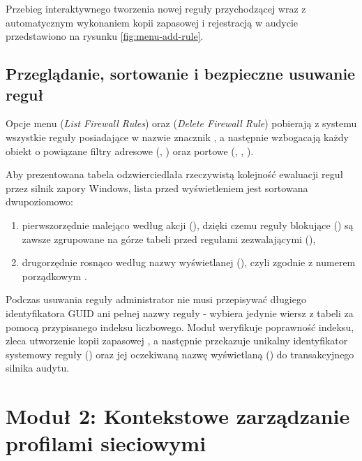 Przebieg interaktywnego tworzenia nowej reguły przychodzącej wraz z automatycznym wykonaniem kopii zapasowej i rejestracją w audycie przedstawiono na rysunku \ref{fig:menu-add-rule}.


\subsection{Przeglądanie, sortowanie i bezpieczne usuwanie reguł}\label{subsec:przegladanie-usuwanie-regul}

Opcje menu  (\textit{List Firewall Rules}) oraz  (\textit{Delete Firewall Rule}) pobierają z systemu wszystkie reguły posiadające w nazwie znacznik , a następnie wzbogacają każdy obiekt o powiązane filtry adresowe (, ) oraz portowe (, , ).

Aby prezentowana tabela odzwierciedlała rzeczywistą kolejność ewaluacji reguł przez silnik zapory Windows, lista przed wyświetleniem jest sortowana dwupoziomowo:
\begin{enumerate}
    \item pierwszorzędnie malejąco według akcji (), dzięki czemu reguły blokujące () są zawsze zgrupowane na górze tabeli przed regułami zezwalającymi (),
    \item drugorzędnie rosnąco według nazwy wyświetlanej (), czyli zgodnie z numerem porządkowym .
\end{enumerate}
Podczas usuwania reguły administrator nie musi przepisywać długiego identyfikatora GUID ani pełnej nazwy reguły - wybiera jedynie wiersz z tabeli za pomocą przypisanego indeksu liczbowego. Moduł weryfikuje poprawność indeksu, zleca utworzenie kopii zapasowej , a następnie przekazuje unikalny identyfikator systemowy reguły () oraz jej oczekiwaną nazwę wyświetlaną () do transakcyjnego silnika audytu.

\section{Moduł 2: Kontekstowe zarządzanie profilami sieciowymi}\label{sec:modul-profile}

